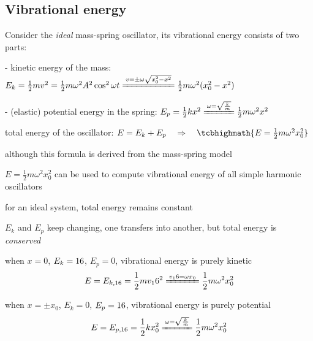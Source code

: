 \subsection{Vibrational energy}

Consider the \emph{ideal} mass-spring oscillator, its vibrational energy consists of two parts:

\begin{compactitem}
	\item[-] kinetic energy of the mass: $E_k = \frac{1}{2} mv^2 = \frac{1}{2} m \omega^2 A^2 \cos^2\omega t \xlongequal{v=\pm\omega\sqrt{x_0^2-x^2}} \frac{1}{2}m\omega^2 (x_0^2-x^2)$
	
	\item[-] (elastic) potential energy in the spring: $E_p = \frac{1}{2} kx^2  \xlongequal{\omega = \sqrt{\frac{k}{m}}} \frac{1}{2}m\omega^2 x^2$
\end{compactitem}

total energy of the oscillator: $E = E_k + E_p \RA \tcbhighmath{E = \frac{1}{2}m\omega^2x_0^2}$

\cmt although this formula is derived from the mass-spring model

$E = \frac{1}{2}m\omega^2x_0^2$ can be used to compute vibrational energy of all simple harmonic oscillators

\cmt for an ideal system, total energy remains constant

$E_k$ and $E_p$ keep changing, one transfers into another, but total energy is \emph{conserved}

\cmt when $x=0$, $E_k = 16$, $E_p=0$, vibrational energy is purely kinetic
\begin{equation*}
	E=E_{k,\tmax}=\frac{1}{2}mv_\tmax^2 \xlongequal{v_\tmax = \omega x_0} \frac{1}{2}m\omega^2x_0^2
\end{equation*}

\cmt when $x=\pm x_0$, $E_k = 0$, $E_p=16$, vibrational energy is purely potential
\begin{equation*}
	E=E_{p,\tmax}=\frac{1}{2}kx_0^2 \xlongequal{\omega=\sqrt{\frac{k}{m}}} \frac{1}{2}m\omega^2x_0^2
\end{equation*}

